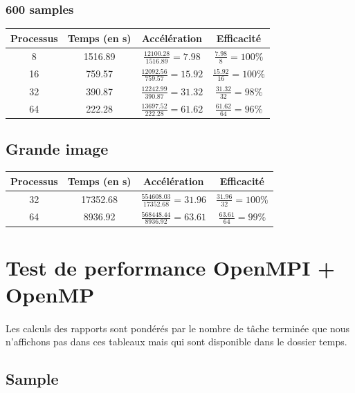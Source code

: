 \documentclass{article}
\begin{document}
\subsubsection{600 samples}

\begin{tabular}{ | c | c | c | c |}
  \hline
  Processus & Temps (en s) & Accélération & Efficacité \\
  \hline
  8 & 1516.89 & $\frac{12100.28}{1516.89} = 7.98 $ & $ \frac{7.98}{8} = 100\% $ \\
  16 & 759.57 & $\frac{12092.56}{759.57} = 15.92 $ & $ \frac{15.92}{16} = 100\% $ \\
  32 & 390.87 & $\frac{12242.99}{390.87} = 31.32 $ & $ \frac{31.32}{32} = 98\% $ \\
  64 & 222.28 & $\frac{13697.52}{222.28} = 61.62 $ & $ \frac{61.62}{64} = 96\% $ \\
  \hline
\end{tabular}

\subsection{Grande image}

\begin{tabular}{ | c | c | c | c |}
  \hline
  Processus & Temps (en s) & Accélération & Efficacité \\
  \hline
  32 & 17352.68 & $\frac{554608.03}{17352.68} = 31.96 $ & $ \frac{31.96}{32} = 100\% $ \\
  64 & 8936.92 & $\frac{568448.44}{8936.92} = 63.61 $ & $ \frac{63.61}{64} = 99\% $ \\
  \hline
\end{tabular}

\section{Test de performance OpenMPI + OpenMP}

\paragraph{}
Les calculs des rapports sont pond\'er\'es par le nombre de t\^ache termin\'ee que nous n'affichons
pas dans ces tableaux mais qui sont disponible dans le dossier temps.

\subsection{Sample}
\end{document}
